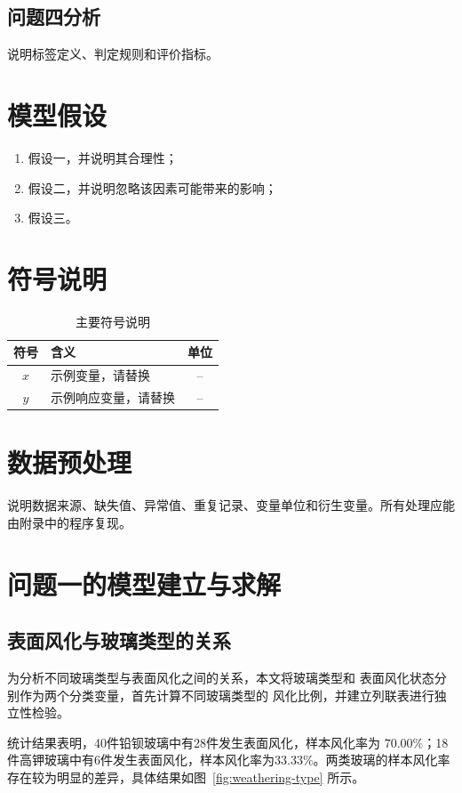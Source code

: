 \documentclass[UTF8,a4paper,12pt,fontset=fandol]{ctexart}
\begin{document}
\subsection{问题四分析}
说明标签定义、判定规则和评价指标。

\section{模型假设}
\begin{enumerate}
  \item 假设一，并说明其合理性；
  \item 假设二，并说明忽略该因素可能带来的影响；
  \item 假设三。
\end{enumerate}

\section{符号说明}
\begin{table}[H]
  \centering
  \caption{主要符号说明}
  \begin{tabularx}{\textwidth}{cXc}
    \toprule
    符号 & 含义 & 单位 \\
    \midrule
    $x$ & 示例变量，请替换 & -- \\
    $y$ & 示例响应变量，请替换 & -- \\
    \bottomrule
  \end{tabularx}
  \label{tab:symbols}
\end{table}

\section{数据预处理}
说明数据来源、缺失值、异常值、重复记录、变量单位和衍生变量。所有处理应能由附录中的程序复现。

\section{问题一的模型建立与求解}

\subsection{表面风化与玻璃类型的关系}

为分析不同玻璃类型与表面风化之间的关系，本文将玻璃类型和
表面风化状态分别作为两个分类变量，首先计算不同玻璃类型的
风化比例，并建立列联表进行独立性检验。

统计结果表明，40件铅钡玻璃中有28件发生表面风化，样本风化率为
$70.00\%$；18件高钾玻璃中有6件发生表面风化，样本风化率为$33.33\%$。两类玻璃的样本风化率存在较为明显的差异，具体结果如图~\ref{fig:weathering-type} 所示。
\end{document}
